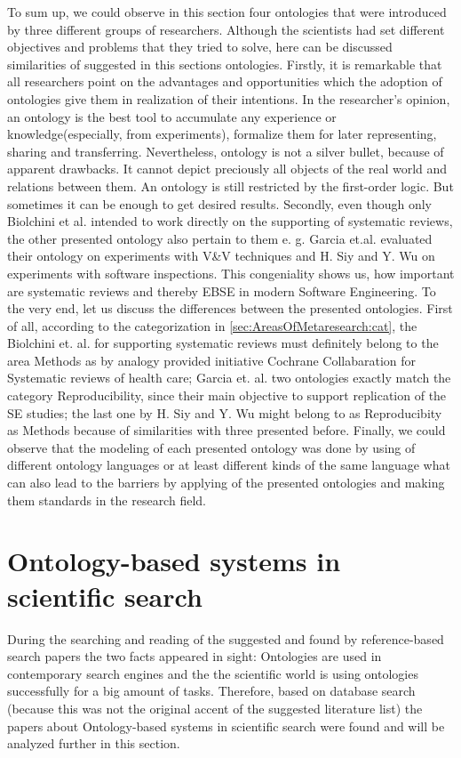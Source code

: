 	
	To sum up, we could observe in this section four ontologies that were introduced by three different groups of researchers. Although the scientists had set different objectives and problems that they tried to solve, here can be discussed similarities of suggested in this sections ontologies. Firstly, it is remarkable that all researchers point on the advantages and opportunities which the adoption of ontologies give them in realization of their intentions. In the researcher's opinion, an ontology is the best tool to accumulate any experience or knowledge(especially, from experiments), formalize them for later representing, sharing and transferring. Nevertheless, ontology is not a silver bullet, because of apparent drawbacks. It cannot depict preciously all objects of the real world and relations between them. An ontology is still restricted by the first-order logic. But sometimes it can be enough to get desired results. Secondly, even though only Biolchini et al.\cite{Bio07} intended to work directly on the supporting of systematic reviews, the other presented ontology also pertain to them e. g. Garcia et.al.\cite{Gar08} evaluated their ontology on experiments with V\&V techniques\cite{Bas87} and H. Siy and Y. Wu \cite{SiyWu12} on experiments with software inspections\cite{Bas99}. This congeniality shows us, how important are systematic reviews and thereby EBSE in modern Software Engineering.\newline
	To the very end, let us discuss the differences between the presented ontologies. First of all, according to the categorization in \autoref{sec:AreasOfMetaresearch:cat}, the Biolchini et. al. for supporting systematic reviews\cite{Bio07} must definitely belong to the area Methods as by analogy provided initiative Cochrane Collabaration for Systematic reviews of health care; Garcia et. al. two ontologies\cite{Gar08}\cite{Gar11} exactly match the category Reproducibility, since their main objective to support replication of the SE studies; the last one by H. Siy and Y. Wu\cite{SiyWu12} might belong to as Reproducibity as Methods because of similarities with three presented before. Finally, we could observe that the modeling of each presented ontology was done by using of different ontology languages or at least different kinds of the same language what can also lead to the barriers by applying of the presented ontologies and making them standards in the research field.
	  	 
\section{Ontology-based systems in scientific search}
During the searching and reading of the suggested and found by reference-based search papers the two facts appeared in sight: Ontologies are used in contemporary search engines and the the scientific world is using ontologies successfully for a big amount of tasks. Therefore, based on database search (because this was not the original accent of the suggested literature list) the papers about Ontology-based systems in scientific search were found and will be analyzed further in this section.
